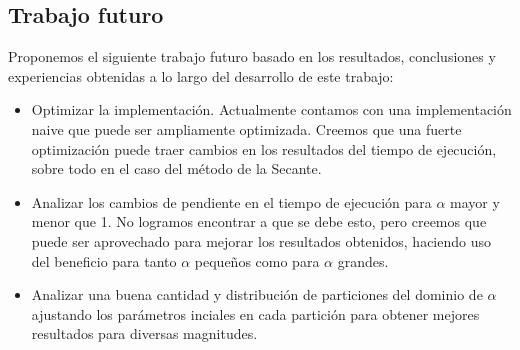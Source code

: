 \subsection{Trabajo futuro}

Proponemos el siguiente trabajo futuro basado en los resultados, conclusiones y
experiencias obtenidas a lo largo del desarrollo de este trabajo:

\begin{itemize}

\item Optimizar la implementación. Actualmente contamos con una implementación
naive que puede ser ampliamente optimizada. Creemos que una fuerte optimización
puede traer cambios en los resultados del tiempo de ejecución, sobre todo en el
caso del método de la Secante.

\item Analizar los cambios de pendiente en el tiempo de ejecución para $\alpha$
mayor y menor que 1. No logramos encontrar a que se debe esto, pero creemos que
puede ser aprovechado para mejorar los resultados obtenidos, haciendo uso del
beneficio para tanto $\alpha$ pequeños como para $\alpha$ grandes.

\item Analizar una buena cantidad y distribución de particiones del dominio de
$\alpha$ ajustando los parámetros inciales en cada partición para obtener
mejores resultados para diversas magnitudes.

\end{itemize}
